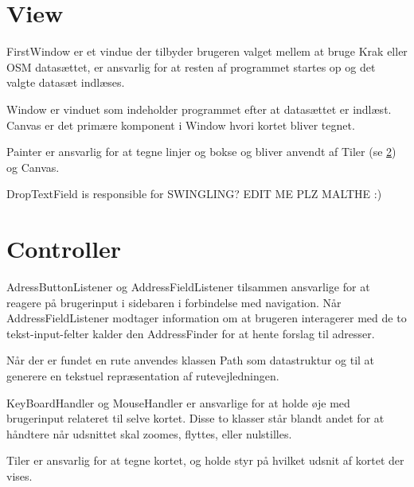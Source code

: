 \section{View}
\label{sec:view}

FirstWindow er et vindue der tilbyder brugeren valget mellem at bruge Krak eller OSM datasættet, er ansvarlig for at resten af programmet startes op og det valgte datasæt indlæses.

Window er vinduet som indeholder programmet efter at datasættet er indlæst. Canvas er det primære komponent i Window hvori kortet bliver tegnet.

Painter er ansvarlig for at tegne linjer og bokse og bliver anvendt af Tiler (se \ref{sec:controller}) og Canvas.

DropTextField is responsible for SWINGLING? EDIT ME PLZ MALTHE :)

\section{Controller}
\label{sec:controller}

AdressButtonListener og AddressFieldListener tilsammen ansvarlige for at reagere på brugerinput i sidebaren i forbindelse med navigation. Når AddressFieldListener modtager information om at brugeren interagerer med de to tekst-input-felter kalder den AddressFinder for at hente forslag til adresser.

Når der er fundet en rute anvendes klassen Path som datastruktur og til at generere en tekstuel repræsentation af rutevejledningen.

KeyBoardHandler og MouseHandler er ansvarlige for at holde øje med brugerinput relateret til selve kortet. Disse to klasser står blandt andet for at håndtere når udsnittet skal zoomes, flyttes, eller nulstilles.

Tiler er ansvarlig for at tegne kortet, og holde styr på hvilket udsnit af kortet der vises.